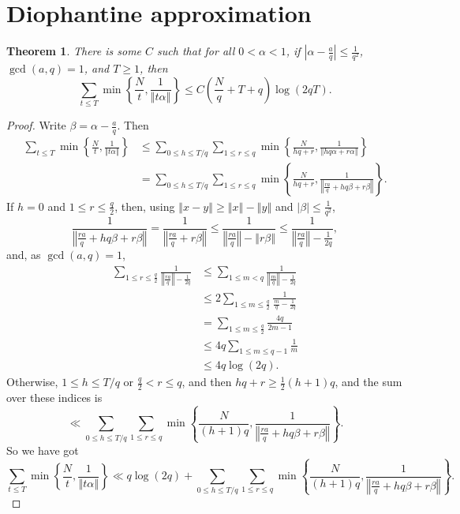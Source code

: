 \documentclass{article}
\newcommand{\norm}[1]{\left\Vert #1 \right\Vert}
\newtheorem{theorem}{Theorem}
\theoremstyle{definition}
\begin{document}
\section{Diophantine approximation}
\begin{theorem}
There is some $C$ such that 
for all $0<\alpha<1$, 
if $\left| \alpha - \frac{a}{q} \right| \leq \frac{1}{q^2}$, $\gcd(a,q)=1$, and
 $T \geq 1$, then
\[
\sum_{t \leq T} \min\left\{ \frac{N}{t}, \frac{1}{\norm{t\alpha}} \right\} \leq
C \left(\frac{N}{q}+T+q\right) \log(2qT).
\]
\label{diophantine}
\end{theorem}
\begin{proof}
Write $\beta = \alpha - \frac{a}{q}$. Then
\begin{align*}
\sum_{t \leq T} \min\left\{ \frac{N}{t}, \frac{1}{\norm{t\alpha}} \right\}&\leq \sum_{0 \leq h \leq T/q} \sum_{1 \leq r \leq q}
\min\left\{ \frac{N}{hq+r}, \frac{1}{\norm{hq\alpha+r\alpha}} \right\}\\
&= \sum_{0 \leq h \leq T/q} \sum_{1 \leq r \leq q}
\min\left\{ \frac{N}{hq+r}, \frac{1}{\norm{\frac{ra}{q}+hq\beta+r\beta}} \right\}.
\end{align*}
If $h=0$ and $1 \leq r \leq \frac{q}{2}$, then, using $\norm{x-y} \geq \norm{x}-\norm{y}$ and $|\beta| \leq \frac{1}{q^2}$,
\[
 \frac{1}{\norm{\frac{ra}{q}+hq\beta+r\beta}} = \frac{1}{\norm{\frac{ra}{q}+r\beta}}
\leq \frac{1}{\norm{\frac{ra}{q}} - \norm{r\beta}}
\leq \frac{1}{\norm{\frac{ra}{q}} - \frac{1}{2q}},
\]
and, as $\gcd(a,q)=1$,
\begin{align*}
\sum_{1 \leq r \leq \frac{q}{2}} \frac{1}{\norm{\frac{ra}{q}} - \frac{1}{2q}} &\leq
\sum_{1 \leq m < q} \frac{1}{\norm{\frac{m}{q}}-\frac{1}{2q}}\\
&\leq 2 \sum_{1 \leq m \leq \frac{q}{2}} \frac{1}{\frac{m}{q}-\frac{1}{2q}}\\
&= \sum_{1 \leq m \leq \frac{q}{2}} \frac{4q}{2m-1}\\
&\leq 4q \sum_{1 \leq m \leq q-1} \frac{1}{m}\\
&\leq 4q \log(2q).
\end{align*}
Otherwise, $1 \leq h \leq T/q$ or $\frac{q}{2}<r \leq q$, and then
$hq+r \geq \frac{1}{2}(h+1)q$, and the sum over these indices is
\[
\ll \sum_{0 \leq h \leq T/q} \sum_{1 \leq r \leq q} \min\left\{\frac{N}{(h+1)q},\frac{1}{\norm{\frac{ra}{q}+hq\beta+r\beta}}\right\}.
\]
So we have got
\[
\sum_{t \leq T} \min\left\{ \frac{N}{t}, \frac{1}{\norm{t\alpha}} \right\} \ll q \log (2q) + \sum_{0 \leq h \leq T/q} \sum_{1 \leq r \leq q} \min\left\{\frac{N}{(h+1)q},\frac{1}{\norm{\frac{ra}{q}+hq\beta+r\beta}}\right\}.
\]


\end{proof}
\end{document}
